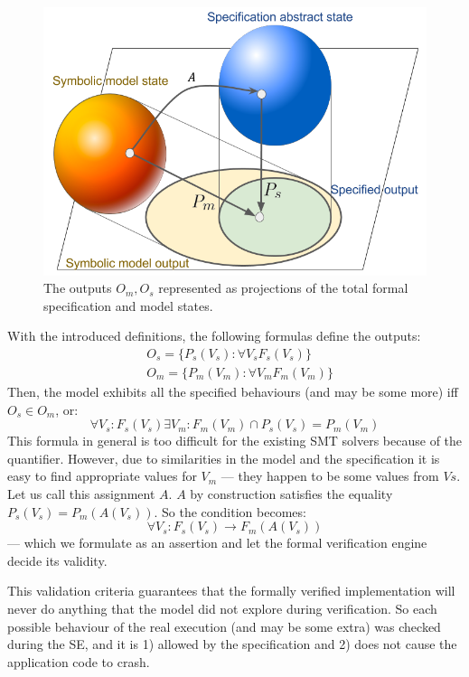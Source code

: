 \documentclass[letterpaper,twocolumn,10pt]{article}
\begin{document}
\begin{figure}[h]
    \centering
    \includegraphics[width=\columnwidth]{figures/projections.png}
    \caption{The outputs \(O_m, O_s\) represented as projections of the total
      formal specification and model states.}
    \label{projections}
\end{figure}

With the introduced definitions, the following formulas define the outputs:
\[
  \begin{aligned}
    &O_s = \{P_s(V_s): \forall V_s F_s(V_s)\} \\
    &O_m = \{P_m(V_m) : \forall V_m F_m(V_m)\}
  \end{aligned}
\]
Then, the model exhibits all the specified behaviours (and may be some more) iff
\(O_s \in O_m\), or:
\[
\forall V_s : F_s(V_s) \exists V_m : F_m (V_m) \cap P_s(V_s) = P_m(V_m)
\]
This formula in general is too difficult for the existing SMT solvers because of
the quantifier. However, due to similarities in the model and the specification
it is easy to find appropriate values for \(V_m\) --- they happen to be some
values from \(Vs\). Let us call this assignment \(A\). \(A\) by construction
satisfies the equality \(P_s(V_s)=P_m(A(V_s))\). So the condition becomes:
\[
\forall V_s : F_s(V_s) \rightarrow F_m(A(V_s))
\]
--- which we formulate as an assertion and let the formal verification engine
decide its validity.

This validation criteria guarantees that the formally verified implementation
will never do anything that the model did not explore during verification. So
each possible behaviour of the real execution (and may be some extra) was
checked during the SE, and it is 1) allowed by the specification and 2) does not
cause the application code to crash.
\end{document}
